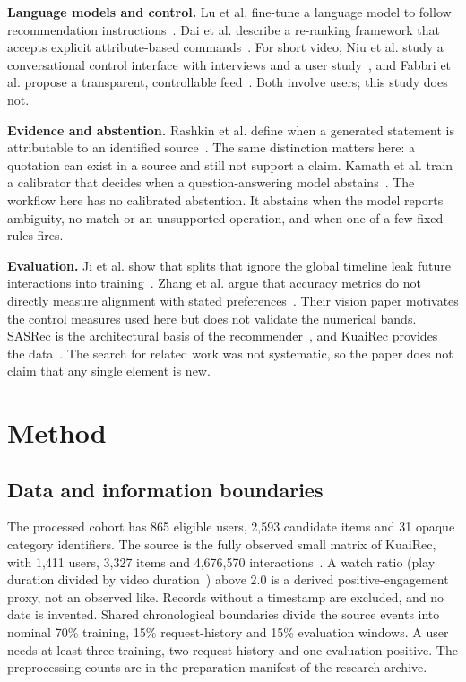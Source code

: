 \documentclass[conference]{IEEEtran}
\begin{document}
\textbf{Language models and control.} Lu et al. fine-tune a language model to follow recommendation instructions~\cite{lu2024aligning}. Dai et al. describe a re-ranking framework that accepts explicit attribute-based commands~\cite{dai2025token}. For short video, Niu et al. study a conversational control interface with interviews and a user study~\cite{niu2025chat}, and Fabbri et al. propose a transparent, controllable feed~\cite{fabbri2026feeding}. Both involve users; this study does not.

\textbf{Evidence and abstention.} Rashkin et al. define when a generated statement is attributable to an identified source~\cite{rashkin2023attribution}. The same distinction matters here: a quotation can exist in a source and still not support a claim. Kamath et al. train a calibrator that decides when a question-answering model abstains~\cite{kamath2020selective}. The workflow here has no calibrated abstention. It abstains when the model reports ambiguity, no match or an unsupported operation, and when one of a few fixed rules fires.

\textbf{Evaluation.} Ji et al. show that splits that ignore the global timeline leak future interactions into training~\cite{ji2023leakage}. Zhang et al. argue that accuracy metrics do not directly measure alignment with stated preferences~\cite{zhang2026context}. Their vision paper motivates the control measures used here but does not validate the numerical bands. SASRec is the architectural basis of the recommender~\cite{kang2018sasrec}, and KuaiRec provides the data~\cite{gao2022kuairec}. The search for related work was not systematic, so the paper does not claim that any single element is new.

\section{Method}
\subsection{Data and information boundaries}
The processed cohort has 865 eligible users, 2,593 candidate items and 31 opaque category identifiers. The source is the fully observed small matrix of KuaiRec, with 1,411 users, 3,327 items and 4,676,570 interactions~\cite{gao2022kuairec}. A watch ratio (play duration divided by video duration~\cite{kuairecdocs}) above 2.0 is a derived positive-engagement proxy, not an observed like. Records without a timestamp are excluded, and no date is invented. Shared chronological boundaries divide the source events into nominal 70\% training, 15\% request-history and 15\% evaluation windows. A user needs at least three training, two request-history and one evaluation positive. The preprocessing counts are in the preparation manifest of the research archive.
\end{document}

